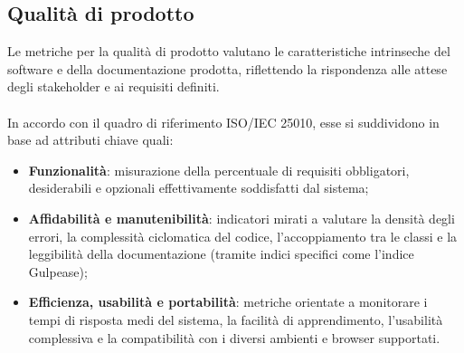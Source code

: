 \subsection{Qualità di prodotto}
Le metriche per la qualità di prodotto valutano le caratteristiche intrinseche del software e della documentazione prodotta, riflettendo la rispondenza alle attese degli stakeholder e ai requisiti definiti. \\
\\
In accordo con il quadro di riferimento ISO/IEC 25010, esse si suddividono in base ad attributi chiave quali:
\begin{itemize}
    \item \textbf{Funzionalità}: misurazione della percentuale di requisiti obbligatori, desiderabili e opzionali effettivamente soddisfatti dal sistema;
    \item \textbf{Affidabilità e manutenibilità}: indicatori mirati a valutare la densità degli errori, la complessità ciclomatica del codice, l'accoppiamento tra le classi e la leggibilità della documentazione (tramite indici specifici come l'indice Gulpease);
    \item \textbf{Efficienza, usabilità e portabilità}: metriche orientate a monitorare i tempi di risposta medi del sistema, la facilità di apprendimento, l'usabilità complessiva e la compatibilità con i diversi ambienti e browser supportati.
\end{itemize}
